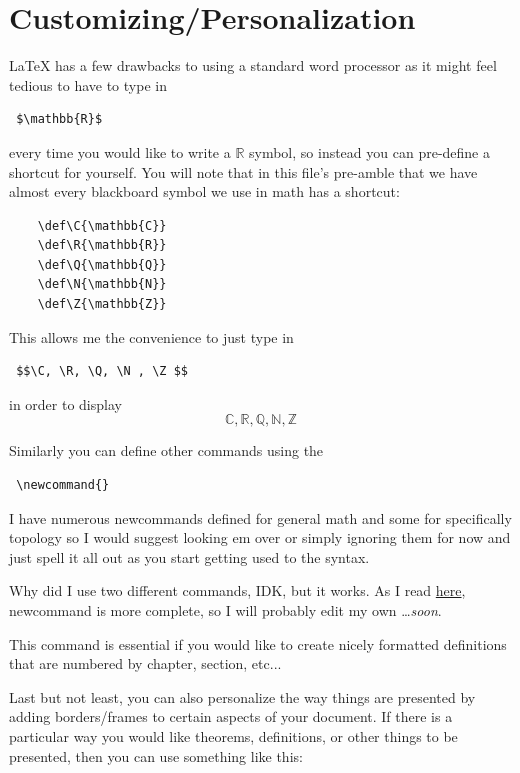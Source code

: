 \documentclass[12pt, letterpaper]{report}
\newcounter{theo}\setcounter{theo}{0}
\newcounter{defi}[chapter] \setcounter{defi}{0}
\newcounter{proc}[section] \setcounter{proc}{0}
\newcommand{\0}{\emptyset}
\def\C{\mathbb{C}}
\def\R{\mathbb{R}}
\def\Q{\mathbb{Q}}
\def\N{\mathbb{N}}
\def\Z{\mathbb{Z}}
\theoremstyle{theorem}
\theoremstyle{definition}
\theoremstyle{definition}
\theoremstyle{definition}
\theoremstyle{definition}
\theoremstyle{theorem}
\theoremstyle{theorem}
\theoremstyle{remark}
\begin{document}
\newpage

\section{Customizing/Personalization}

\LaTeX \; has a few drawbacks to using a standard word processor as it might feel tedious to have to type in \begin{verbatim} $\mathbb{R}$\end{verbatim} every time you would like to write a $\mathbb{R}$ symbol, so instead you can pre-define a shortcut for yourself.  You will note that in this file's pre-amble that we have almost every blackboard symbol we use in math has a shortcut:
	
	\begin{lstlisting}
	\def\C{\mathbb{C}}
	\def\R{\mathbb{R}}
	\def\Q{\mathbb{Q}}
	\def\N{\mathbb{N}}
	\def\Z{\mathbb{Z}}
	\end{lstlisting}

This allows me the convenience to just type in \begin{verbatim} $$\C, \R, \Q, \N , \Z $$ \end{verbatim} in order to display $$\C, \R, \Q, \N , \Z $$

Similarly you can define other commands using the \begin{verbatim} \newcommand{} \end{verbatim}

I have numerous newcommands defined for general math and some for specifically topology so I would suggest looking em over or simply ignoring them for now and just spell it all out as you start getting used to the syntax.



Why did I use two different commands, IDK, but it works.  As I read \href{https://tex.stackexchange.com/questions/655/what-is-the-difference-between-def-and-newcommand}{here}, newcommand is more complete, so I will probably edit my own \ldots \emph{soon}.

This command is essential if you would like to create nicely formatted definitions that are numbered by chapter, section, etc...

\newpage

Last but not least, you can also personalize the way things are presented by adding borders/frames to certain aspects of your document.  If there is a particular way you would like theorems, definitions, or other things to be presented, then you can use something like this:
\end{document}
